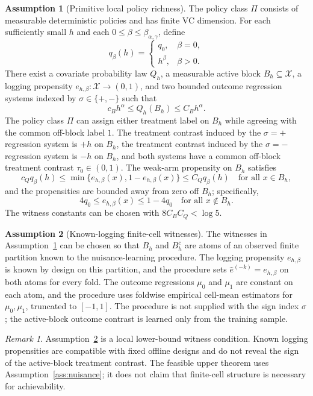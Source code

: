 \documentclass[11pt]{article}
\theoremstyle{definition}
\newtheorem{assumption}{Assumption}
\theoremstyle{plain}
\theoremstyle{remark}
\newtheorem{remark}{Remark}
\begin{document}
\begin{assumption}[Primitive local policy richness]\label{ass:primitive-cube}
The policy class \(\Pi\) consists of measurable deterministic policies and has
finite VC dimension.  For each sufficiently small \(h\) and each
\(0\le\beta\le\beta_{\alpha,\gamma}\), define
\[
q_\beta(h)=
\begin{cases}
q_0,& \beta=0,\\
h^\beta,& \beta>0.
\end{cases}
\]
There exist a covariate probability law \(Q_h\), a measurable active block
\(B_h\subseteq\mathcal X\), a logging propensity
\(e_{h,\beta}:\mathcal X\to(0,1)\), and two bounded outcome regression
systems indexed by \(\sigma\in\{+,-\}\) such that
\[
c_B h^\alpha\le Q_h(B_h)\le C_B h^\alpha.
\]
The policy class \(\Pi\) can assign either treatment label on \(B_h\) while
agreeing with the common off-block label \(1\).  The treatment contrast
induced by the \(\sigma=+\) regression system is \(+h\) on \(B_h\), the
treatment contrast induced by the \(\sigma=-\) regression system is \(-h\)
on \(B_h\), and both systems have a common off-block treatment contrast
\(\tau_0\in(0,1)\).  The weak-arm propensity on \(B_h\) satisfies
\[
c_Qq_\beta(h)\le \min\{e_{h,\beta}(x),1-e_{h,\beta}(x)\}
\le C_Qq_\beta(h)
\quad\text{for all }x\in B_h,
\]
and the propensities are bounded away from zero off \(B_h\); specifically,
\[
4q_0\le e_{h,\beta}(x)\le 1-4q_0
\quad\text{for all }x\notin B_h.
\]
The witness constants can be chosen with \(8C_BC_Q<\log 5\).
\end{assumption}

\begin{assumption}[Known-logging finite-cell witnesses]\label{ass:learnable-cube}
The witnesses in Assumption~\ref{ass:primitive-cube} can be chosen so that
\(B_h\) and \(B_h^c\) are atoms of an observed finite partition known to the
nuisance-learning procedure.  The logging propensity \(e_{h,\beta}\) is known
by design on this partition, and the procedure sets
\(\widehat e^{(-k)}=e_{h,\beta}\) on both atoms for every fold.  The outcome
regressions \(\mu_0\) and \(\mu_1\) are constant on each atom, and the
procedure uses foldwise empirical cell-mean estimators for
\(\mu_0,\mu_1\), truncated to \([-1,1]\).  The procedure is not supplied with
the sign index \(\sigma\); the active-block outcome contrast is learned only
from the training sample.
\end{assumption}

\begin{remark}
Assumption~\ref{ass:learnable-cube} is a local lower-bound witness condition.
Known logging propensities are compatible with fixed offline designs and do
not reveal the sign of the active-block treatment contrast.  The feasible
upper theorem uses Assumption~\ref{ass:nuisance}; it does not claim that
finite-cell structure is necessary for achievability.
\end{remark}
\end{document}
